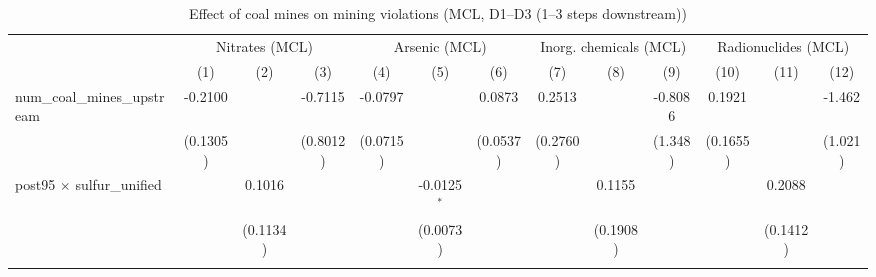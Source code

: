 
\begin{table}[htbp]
   
   \caption{\label{2sls_4step_d1_d3_minevio_mcl} Effect of coal mines on mining violations (MCL, D1--D3 (1--3 steps downstream))}
   \bigskip
   
   \centering
   
   \begin{adjustbox}{width = \textwidth, center}
      
      
      \begin{tabular}{lcccccccccccc}
         \toprule
         
          & \multicolumn{3}{c}{Nitrates (MCL)} & \multicolumn{3}{c}{Arsenic (MCL)} & \multicolumn{3}{c}{Inorg. chemicals (MCL)} & \multicolumn{3}{c}{Radionuclides (MCL)}\\
         
                                                           & (1)           & (2)           & (3)           & (4)           & (5)                   & (6)                   & (7)           & (8)           & (9)           & (10)          & (11)          & (12)\\  
         
         \midrule 
         num\_coal\_mines\_upstream                        & -0.2100       &               & -0.7115       & -0.0797       &                       & 0.0873                & 0.2513        &               & -0.8086       & 0.1921        &               & -1.462\\   
                                                           & (0.1305)      &               & (0.8012)      & (0.0715)      &                       & (0.0537)              & (0.2760)      &               & (1.348)       & (0.1655)      &               & (1.021)\\   
         post95 $\times$ sulfur\_unified                   &               & 0.1016        &               &               & -0.0125$^{*}$         &                       &               & 0.1155        &               &               & 0.2088        &   \\   
                                                           &               & (0.1134)      &               &               & (0.0073)              &                       &               & (0.1908)      &               &               & (0.1412)      &   \\   
         
          \\
         

\end{tabular}
\end{adjustbox}
\end{table}

